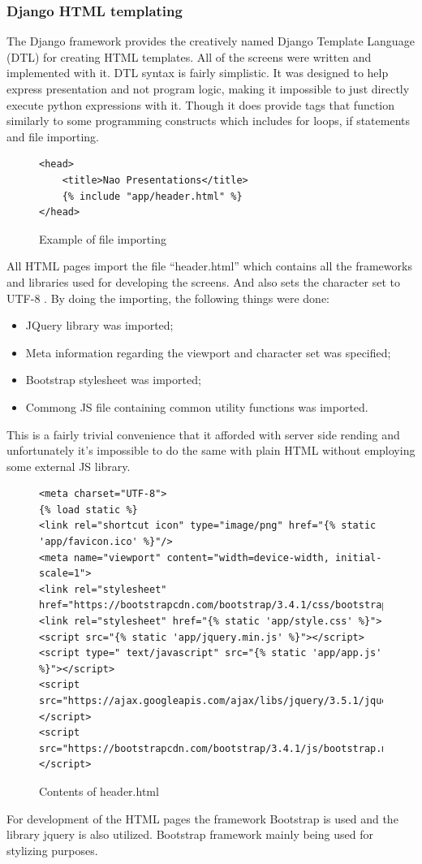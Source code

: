 \documentclass[12pt, fleqn, a4paper]{article}
\begin{document}
\subsubsection{Django HTML templating}
The Django framework provides the creatively named Django Template Language (DTL) for creating HTML templates. All of the screens were written and implemented with it. DTL syntax is fairly simplistic. It was designed to help express presentation and not program logic, making it impossible to just directly execute python expressions with it. Though it does provide tags that function similarly to some programming constructs \citep{djangoDev} which includes for loops, if statements and file importing.
\begin{figure}[H]
	\centering
	\begin{verbatim} 
<head>
    <title>Nao Presentations</title>
    {% include "app/header.html" %}
</head>
	\end{verbatim}
	\caption{Example of file importing}
\end{figure}
All HTML pages import the file \enquote{header.html} which contains all the frameworks and libraries used for developing the screens. And also sets the character set to UTF-8 \citep{htmlmanual}. By doing the importing, the following things were done:
\begin{itemize}
	\item JQuery library was imported;
	\item Meta information regarding the viewport and character set was specified;
	\item Bootstrap stylesheet was imported;
	\item Commong JS file containing common utility functions was imported.
\end{itemize}
This is a fairly trivial convenience that it afforded with server side rending and unfortunately it's impossible to do the same with plain HTML without employing some external JS library.
\begin{figure}[H]
	\centering
	\begin{verbatim} 
<meta charset="UTF-8">
{% load static %}
<link rel="shortcut icon" type="image/png" href="{% static 'app/favicon.ico' %}"/>
<meta name="viewport" content="width=device-width, initial-scale=1">
<link rel="stylesheet" href="https://bootstrapcdn.com/bootstrap/3.4.1/css/bootstrap.min.css">
<link rel="stylesheet" href="{% static 'app/style.css' %}">
<script src="{% static 'app/jquery.min.js' %}"></script>
<script type=" text/javascript" src="{% static 'app/app.js' %}"></script>
<script src="https://ajax.googleapis.com/ajax/libs/jquery/3.5.1/jquery.min.js"> </script>
<script src="https://bootstrapcdn.com/bootstrap/3.4.1/js/bootstrap.min.js"> </script>
	\end{verbatim}
	\caption{Contents of header.html}
\end{figure}
For development of the HTML pages the framework Bootstrap is used and the library jquery is also utilized. Bootstrap framework mainly being used for stylizing purposes.
\end{document}
